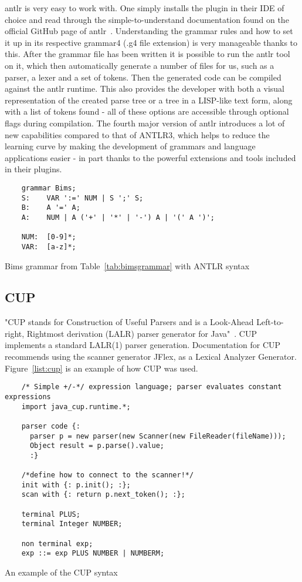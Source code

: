 \gls{antlr} is very easy to work with. One simply installs the plugin in their IDE of choice and read through the simple-to-understand documentation found on the official GitHub page of \gls{antlr}~\cite{ANTLR_Documentation}. Understanding the grammar rules and how to set it up in its respective grammar4 (.g4 file extension) is very manageable thanks to this. After the grammar file has been written it is possible to run the \gls{antlr} tool on it, which then automatically generate a number of files for us, such as a parser, a lexer and a set of tokens. Then the generated code can be compiled against the \gls{antlr} runtime. This also provides the developer with both a visual representation of the created parse tree or a tree in a LISP-like text form, along with a list of tokens found - all of these options are accessible through optional flags during compilation. The fourth major version of \gls{antlr} introduces a lot of new capabilities compared to that of ANTLR3, which helps to reduce the learning curve by making the development of grammars and language applications easier - in part thanks to the powerful extensions and tools included in their plugins.


\begin{listing}[htb!]
  \begin{verbatim}
    grammar Bims;
    S:    VAR ':=' NUM | S ';' S;
    B:    A '=' A;
    A:    NUM | A ('+' | '*' | '-') A | '(' A ')';
    
    NUM:  [0-9]*;
    VAR:  [a-z]*;
  \end{verbatim}
  \caption{Bims grammar from Table~\ref{tab:bimsgrammar} with ANTLR syntax}
  \label{tab:antlrexample}
\end{listing}


\subsection{CUP}
"CUP stands for Construction of Useful Parsers and is a Look-Ahead Left-to-right, Rightmost derivation (LALR) parser generator for Java"~\cite{cupParserGenerator}. CUP implements a standard LALR(1) parser generation. Documentation for CUP recommends using the scanner generator JFlex, as a Lexical Analyzer Generator. Figure~\ref{list:cup} is an example of how CUP was used.


\begin{listing}[htb!]
  \centering
  \begin{verbatim}
    /* Simple +/-*/ expression language; parser evaluates constant expressions
    import java_cup.runtime.*;

    parser code {:
      parser p = new parser(new Scanner(new FileReader(fileName)));
      Object result = p.parse().value;  
      :}

    /*define how to connect to the scanner!*/
    init with {: p.init(); :};
    scan with {: return p.next_token(); :};

    terminal PLUS;
    terminal Integer NUMBER;

    non terminal exp;
    exp ::= exp PLUS NUMBER | NUMBERM;
  \end{verbatim}
  \caption{An example of the CUP syntax}
  \label{list:cup}
\end{listing}


